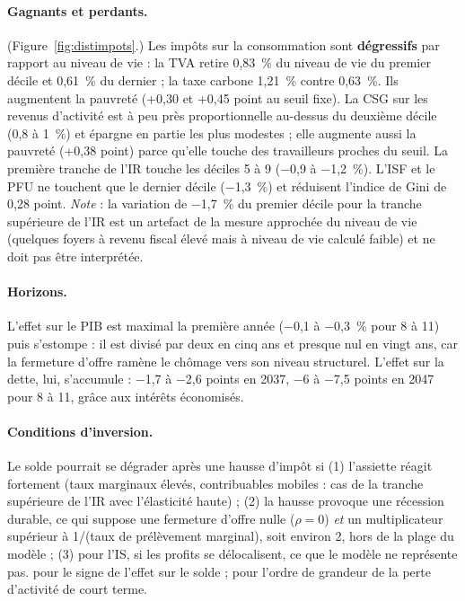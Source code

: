 \paragraph{Gagnants et perdants.} (Figure~\ref{fig:distimpots}.) Les impôts sur la consommation sont
\textbf{dégressifs} par rapport au niveau de vie : la TVA retire 0,83~\% du niveau de vie du premier décile et 0,61~\% du
dernier ; la taxe carbone 1,21~\% contre 0,63~\%. Ils augmentent la pauvreté (+0,30 et +0,45 point au seuil fixe). La
CSG sur les revenus d'activité est à peu près proportionnelle au-dessus du deuxième décile (0,8 à 1~\%) et épargne en
partie les plus modestes ; elle augmente aussi la pauvreté (+0,38 point) parce qu'elle touche des travailleurs proches du
seuil. La première tranche de l'IR touche les déciles 5 à 9 ($-$0,9 à $-$1,2~\%). L'ISF et le PFU ne touchent que le
dernier décile ($-$1,3~\%) et réduisent l'indice de Gini de 0,28 point. \emph{Note} : la variation de $-$1,7~\% du premier
décile pour la tranche supérieure de l'IR est un artefact de la mesure approchée du niveau de vie (quelques foyers à
revenu fiscal élevé mais à niveau de vie calculé faible) et ne doit pas être interprétée.

\paragraph{Horizons.} L'effet sur le PIB est maximal la première année ($-$0,1 à $-$0,3~\% pour 8 à 11\md) puis
s'estompe : il est divisé par deux en cinq ans et presque nul en vingt ans, car la fermeture d'offre ramène le chômage
vers son niveau structurel. L'effet sur la dette, lui, s'accumule : $-$1,7 à $-$2,6 points en 2037, $-$6 à $-$7,5 points en
2047 pour 8 à 11\md, grâce aux intérêts économisés.

\paragraph{Conditions d'inversion.} Le solde pourrait se dégrader après une hausse d'impôt si (1) l'assiette réagit
fortement (taux marginaux élevés, contribuables mobiles : cas de la tranche supérieure de l'IR avec l'élasticité haute) ;
(2) la hausse provoque une récession durable, ce qui suppose une fermeture d'offre nulle ($\rho = 0$) \emph{et} un
multiplicateur supérieur à 1/(taux de prélèvement marginal), soit environ 2, hors de la plage du modèle ; (3) pour
l'IS, si les profits se délocalisent, ce que le modèle ne représente pas.  pour le signe de l'effet sur
le solde ;  pour l'ordre de grandeur de la perte d'activité de court terme.

